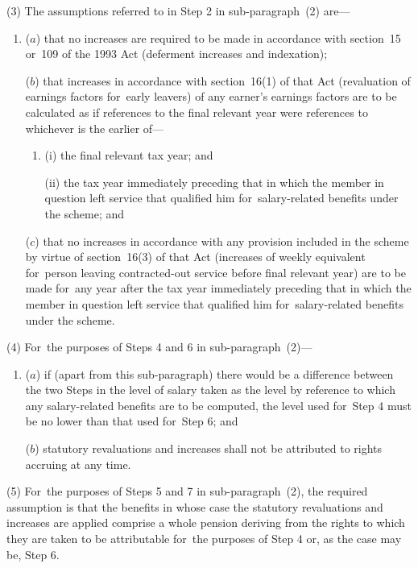 \documentclass[12pt,a4paper]{article}
\begin{document}
(3) The assumptions referred to in Step 2 in sub-paragraph~(2)  are—
\begin{enumerate}\item[]
($a$) that no increases are required to be made in accordance with section~15 or~109 of the 1993 Act (deferment increases and indexation);

($b$) that increases in accordance with section~16(1)  of that Act (revaluation of earnings factors for~early leavers) of any earner’s earnings factors are to be calculated as if references to the final relevant year were references to whichever is the earlier of—
\begin{enumerate}\item[]
(i) the final relevant tax year; and

(ii) the tax year immediately preceding that in which the member in question left service that qualified him for~salary-related benefits under the scheme; and
\end{enumerate}

($c$) that no increases in accordance with any provision included in the scheme by virtue of section~16(3)  of that Act (increases of weekly equivalent for~person leaving contracted-out service before final relevant year) are to be made for~any year after the tax year immediately preceding that in which the member in question left service that qualified him for~salary-related benefits under the scheme.
\end{enumerate}

(4) For~the purposes of Steps 4 and 6 in sub-paragraph~(2)—
\begin{enumerate}\item[]
($a$) if (apart from this sub-paragraph) there would be a difference between the two Steps in the level of salary taken as the level by reference to which any salary-related benefits are to be computed, the level used for~Step 4 must be no lower than that used for~Step 6; and

($b$) statutory revaluations and increases shall not be attributed to rights accruing at any time.
\end{enumerate}

(5) For~the purposes of Steps 5 and 7 in sub-paragraph~(2), the required assumption is that the benefits in whose case the statutory revaluations and increases are applied comprise a whole pension deriving from the rights to which they are taken to be attributable for~the purposes of Step 4 or, as the case may be, Step 6. 
\end{document}
